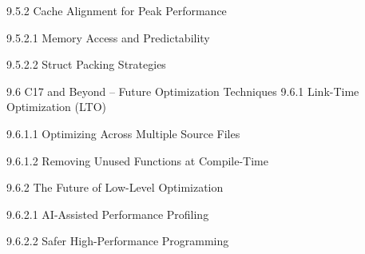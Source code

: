 9.5.2 Cache Alignment for Peak Performance

9.5.2.1 Memory Access and Predictability

9.5.2.2 Struct Packing Strategies

9.6 C17 and Beyond – Future Optimization Techniques
9.6.1 Link-Time Optimization (LTO)

9.6.1.1 Optimizing Across Multiple Source Files

9.6.1.2 Removing Unused Functions at Compile-Time

9.6.2 The Future of Low-Level Optimization

9.6.2.1 AI-Assisted Performance Profiling

9.6.2.2 Safer High-Performance Programming

